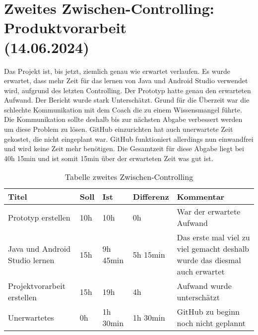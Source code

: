 \section{Zweites Zwischen-Controlling: Produktvorarbeit \\(14.06.2024)}
Das Projekt ist, bis jetzt, ziemlich genau wie erwartet verlaufen. Es wurde erwartet, dass mehr Zeit für das lernen von Java und Android Studio verwendet wird, aufgrund des letzten Controlling. Der Prototyp hatte genau den erwarteten Aufwand. Der Bericht wurde stark Unterschätzt. Grund für die Überzeit war die schlechte Kommunikation mit dem Coach die zu einem Wissensmangel führte. Die Kommunikation sollte deshalb bis zur nächsten Abgabe verbessert werden um diese Problem zu lösen. GitHub einzurichten hat auch unerwartete Zeit gekostet, die nicht eingeplant war. GitHub funktioniert allerdings nun einwandfrei und wird keine Zeit mehr benötigen. Die Gesamtzeit für diese Abgabe liegt bei 40h 15min und ist somit 15min über der erwarteten Zeit was gut ist.
\begin{table}[h]
    \begin{tabularx}{\textwidth}{X|X|X|X|X}
        \textbf{Titel} & \textbf{Soll} & \textbf{Ist} & \textbf{Differenz} & \textbf{Kommentar} \\ \hline
        Prototyp erstellen & 10h & 10h & 0h & War der erwartete Aufwand \\\hline
        Java und Android Studio lernen & 15h & 9h 45min & 5h 15min & Das erste mal viel zu viel gemacht deshalb wurde das diesmal auch erwartet \\\hline
        Projektvorarbeit erstellen & 15h & 19h &  4h & Aufwand wurde unterschätzt \\\hline
        Unerwartetes & 0h & 1h 30min & 1h 30min & GitHub zu beginn noch nicht geplannt \\
    \end{tabularx}
    \caption{Tabelle zweites Zwischen-Controlling}
\end{table}